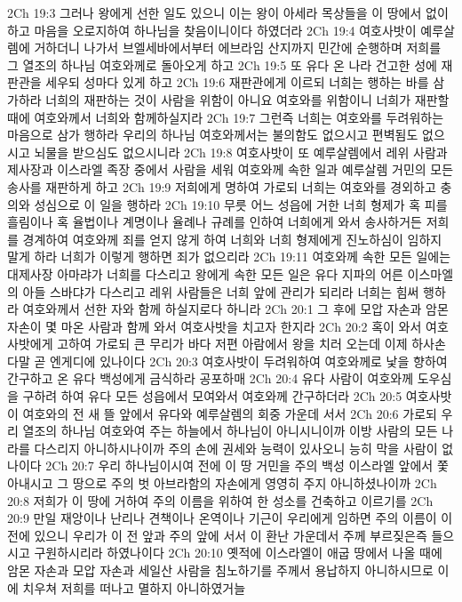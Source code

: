 2Ch 19:3  그러나 왕에게 선한 일도 있으니 이는 왕이 아세라 목상들을 이 땅에서 없이하고 마음을 오로지하여 하나님을 찾음이니이다 하였더라
2Ch 19:4  여호사밧이 예루살렘에 거하더니 나가서 브엘세바에서부터 에브라임 산지까지 민간에 순행하며 저희를 그 열조의 하나님 여호와께로 돌아오게 하고
2Ch 19:5  또 유다 온 나라 건고한 성에 재판관을 세우되 성마다 있게 하고
2Ch 19:6  재판관에게 이르되 너희는 행하는 바를 삼가하라 너희의 재판하는 것이 사람을 위함이 아니요 여호와를 위함이니 너희가 재판할 때에 여호와께서 너희와 함께하실지라
2Ch 19:7  그런즉 너희는 여호와를 두려워하는 마음으로 삼가 행하라 우리의 하나님 여호와께서는 불의함도 없으시고 편벽됨도 없으시고 뇌물을 받으심도 없으시니라
2Ch 19:8  여호사밧이 또 예루살렘에서 레위 사람과 제사장과 이스라엘 족장 중에서 사람을 세워 여호와께 속한 일과 예루살렘 거민의 모든 송사를 재판하게 하고
2Ch 19:9  저희에게 명하여 가로되 너희는 여호와를 경외하고 충의와 성심으로 이 일을 행하라
2Ch 19:10  무릇 어느 성읍에 거한 너희 형제가 혹 피를 흘림이나 혹 율법이나 계명이나 율례나 규례를 인하여 너희에게 와서 송사하거든 저희를 경계하여 여호와께 죄를 얻지 않게 하여 너희와 너희 형제에게 진노하심이 임하지 말게 하라 너희가 이렇게 행하면 죄가 없으리라
2Ch 19:11  여호와께 속한 모든 일에는 대제사장 아마랴가 너희를 다스리고 왕에게 속한 모든 일은 유다 지파의 어른 이스마엘의 아들 스바댜가 다스리고 레위 사람들은 너희 앞에 관리가 되리라 너희는 힘써 행하라 여호와께서 선한 자와 함께 하실지로다 하니라
2Ch 20:1  그 후에 모압 자손과 암몬 자손이 몇 마온 사람과 함께 와서 여호사밧을 치고자 한지라
2Ch 20:2  혹이 와서 여호사밧에게 고하여 가로되 큰 무리가 바다 저편 아람에서 왕을 치러 오는데 이제 하사손다말 곧 엔게디에 있나이다
2Ch 20:3  여호사밧이 두려워하여 여호와께로 낯을 향하여 간구하고 온 유다 백성에게 금식하라 공포하매
2Ch 20:4  유다 사람이 여호와께 도우심을 구하려 하여 유다 모든 성읍에서 모여와서 여호와께 간구하더라
2Ch 20:5  여호사밧이 여호와의 전 새 뜰 앞에서 유다와 예루살렘의 회중 가운데 서서
2Ch 20:6  가로되 우리 열조의 하나님 여호와여 주는 하늘에서 하나님이 아니시니이까 이방 사람의 모든 나라를 다스리지 아니하시나이까 주의 손에 권세와 능력이 있사오니 능히 막을 사람이 없나이다
2Ch 20:7  우리 하나님이시여 전에 이 땅 거민을 주의 백성 이스라엘 앞에서 쫓아내시고 그 땅으로 주의 벗 아브라함의 자손에게 영영히 주지 아니하셨나이까
2Ch 20:8  저희가 이 땅에 거하여 주의 이름을 위하여 한 성소를 건축하고 이르기를
2Ch 20:9  만일 재앙이나 난리나 견책이나 온역이나 기근이 우리에게 임하면 주의 이름이 이 전에 있으니 우리가 이 전 앞과 주의 앞에 서서 이 환난 가운데서 주께 부르짖은즉 들으시고 구원하시리라 하였나이다
2Ch 20:10  옛적에 이스라엘이 애굽 땅에서 나올 때에 암몬 자손과 모압 자손과 세일산 사람을 침노하기를 주께서 용납하지 아니하시므로 이에 치우쳐 저희를 떠나고 멸하지 아니하였거늘
